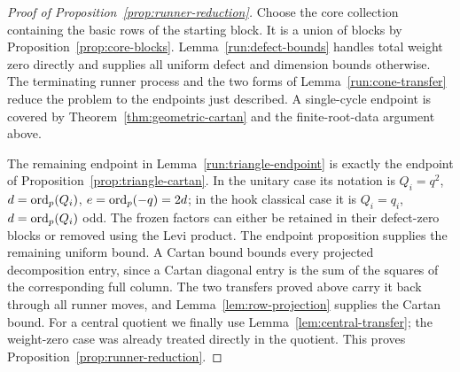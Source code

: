 \begin{proof}[Proof of Proposition~\ref{prop:runner-reduction}]
Choose the core collection containing the basic rows of the
starting block.  It is a union of blocks by
Proposition~\ref{prop:core-blocks}.
Lemma~\ref{run:defect-bounds} handles total weight zero directly
and supplies all uniform defect and dimension bounds otherwise.
The terminating runner process and the two forms of
Lemma~\ref{run:cone-transfer} reduce the problem to the endpoints
just described.  A single-cycle endpoint is covered by
Theorem~\ref{thm:geometric-cartan} and the finite-root-data
argument above.

The remaining endpoint in Lemma~\ref{run:triangle-endpoint} is exactly
the endpoint of Proposition~\ref{prop:triangle-cartan}.
In the unitary case its notation is
\(Q_i=q^2\), \(d=\operatorname{ord}_p(Q_i)\), \(e=\operatorname{ord}_p(-q)=2d\);
in the hook classical case it is
\(Q_i=q_i\), \(d=\operatorname{ord}_p(Q_i)\) odd.
The frozen factors can either be retained in their
defect-zero blocks or removed using the Levi product.
The endpoint proposition supplies the remaining uniform
bound.  A Cartan bound bounds every projected decomposition
entry, since a Cartan diagonal entry is the sum of the
squares of the corresponding full column.
The two transfers proved above carry it back
through all runner moves, and
Lemma~\ref{lem:row-projection} supplies the Cartan bound.
For a central quotient we finally use
Lemma~\ref{lem:central-transfer}; the weight-zero case was
already treated directly in the quotient.
This proves Proposition~\ref{prop:runner-reduction}.
\end{proof}
